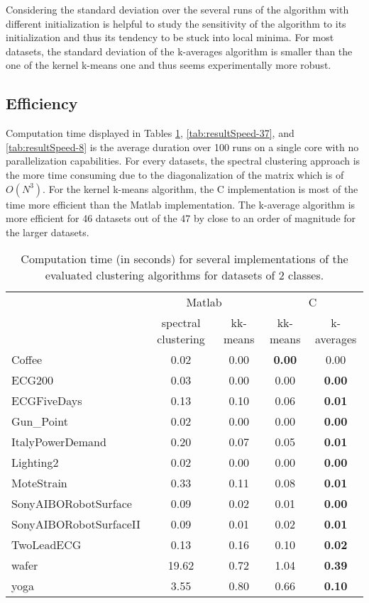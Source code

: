 \documentclass[10pt,letterpaper]{article}
\begin{document}
Considering the standard deviation over the several runs of the algorithm with different initialization is helpful to study the sensitivity of the algorithm to its initialization and thus its tendency to be stuck into local minima. For most datasets, the standard deviation of the k-averages algorithm is smaller than the one of the kernel k-means one and thus seems experimentally more robust.

\subsection{Efficiency}

Computation time displayed in Tables \ref{tab:resultSpeed-2}, \ref{tab:resultSpeed-37}, and \ref{tab:resultSpeed-8} is the average duration over 100 runs on a single core with no parallelization capabilities. For every datasets, the spectral clustering approach is the more time consuming due to the diagonalization of the matrix which is of $O(N^3)$. For the kernel k-means algorithm, the C implementation is most of the time more efficient than the Matlab implementation. The k-average algorithm is more efficient for 46 datasets out of the 47 by close to an order of magnitude for the larger datasets.

\begin{table}
\begin{center}
\caption{Computation time (in seconds) for several implementations of the evaluated clustering algorithms for datasets of 2 classes.}
\label{tab:resultSpeed-2}
\begin{tabular}{lcccc}
 & \multicolumn{2}{c}{Matlab} & \multicolumn{2}{c}{C} \\
 & spectral clustering & kk-means & kk-means & k-averages \\
\hline
Coffee & 0.02 & 0.00 & \textbf{0.00} & 0.00 \\
ECG200 & 0.03 & 0.00 & 0.00 & \textbf{0.00} \\
ECGFiveDays & 0.13 & 0.10 & 0.06 & \textbf{0.01} \\
Gun\_Point & 0.02 & 0.00 & 0.00 & \textbf{0.00} \\
ItalyPowerDemand & 0.20 & 0.07 & 0.05 & \textbf{0.01} \\
Lighting2 & 0.02 & 0.00 & 0.00 & \textbf{0.00} \\
MoteStrain & 0.33 & 0.11 & 0.08 & \textbf{0.01} \\
SonyAIBORobotSurface & 0.09 & 0.02 & 0.01 & \textbf{0.00} \\
SonyAIBORobotSurfaceII & 0.09 & 0.01 & 0.02 & \textbf{0.01} \\
TwoLeadECG & 0.13 & 0.16 & 0.10 & \textbf{0.02} \\
wafer & 19.62 &  0.72 &  1.04 & \textbf{ 0.39} \\
yoga & 3.55 & 0.80 & 0.66 & \textbf{0.10} \\
\end{tabular}
\end{center}
\end{table}
\end{document}
